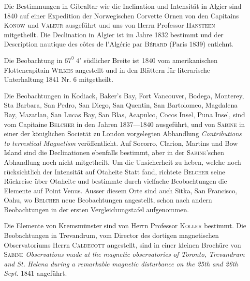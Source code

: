 Die Bestimmungen in Gibraltar wie die Inclination und Intensität in Algier sind 1840 auf einer Expedition der Norwegischen Corvette Ornen von den Capitains \textsc{Konow} und \textsc{Valeur} ausgeführt und uns von Herrn Professor \textsc{Hansteen} mitgetheilt. Die Declination in Algier ist im Jahre 1832 bestimmt und der Description nautique des côtes de l’Algérie par \textsc{Bérard} (Paris 1839) entlehnt.

Die Beobachtung in $67^0\;4'$ südlicher Breite ist 1840 vom amerikanischen Flottencapitain \textsc{Wilkes} angestellt und in den Blättern für literarische Unterhaltung 1841 Nr. 6 mitgetheilt.

Die Beobachtungen in Kodiack, Baker’s Bay, Fort Vancouver, Bodega, Monterey, Sta Barbara, San Pedro, San Diego, San Quentin, San Bartolomeo, Magdalena Bay, Mazatlan, San Lucas Bay, San Blas, Acapulco, Cocos Insel, Puna Insel, sind vom Capitaine \textsc{Belcher} in den Jahren 1837—1840 ausgeführt, und von \textsc{Sabine} in einer der königlichen Societät zu London vor\-gelegten Abhandlung \textit{Contributions to terrestical Magnetism} veröffentlicht. Auf Socorro, Clarion, Martins und Bow Island sind die Declinationen ebenfalls bestimmt, aber in der \textsc{Sabine}’schen Abhandlung noch nicht mitgetheilt. Um die Unsicherheit zu heben, welche noch rücksichtlich der Intensität auf Otaheite Statt fand, richtete \textsc{Belcher} seine Rückreise über Otaheite und bestimmte durch vielfache Beobachtungen die Elemente auf Point Venus. Ausser diesem Orte sind auch Sitka, San Francisco, Oahu, wo \textsc{Belcher} neue Beobachtungen angestellt, schon nach andern Beobachtungen in der ersten Vergleichungstafel aufgenommen.

Die Elemente von Kremsmünster sind von Herrn Professor \textsc{Koller} bestimmt. Die Beobachtungen in Trevandrum, vom Director des dortigen magnetischen Observatoriums Herrn \textsc{Caldecott} angestellt, sind in einer kleinen Brochüre von \textsc{Sabine} \textit{Observations made at the magnetic observatories of Toronto, Trevandrum and St. Helena during a remarkable magnetic disturbance on the 25th and 26th Sept.} 1841 angeführt.

